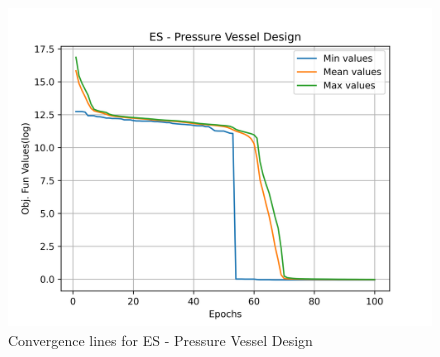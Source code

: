 \begin{figure}[H]
\centering
\caption{Convergence lines for ES - Pressure Vessel Design}
\label{fig:pressure_vessel_problem_solve_es}
\includegraphics[scale=0.5]{images/pressure_vessel_problem_solve_es.png}
\end{figure}
        
